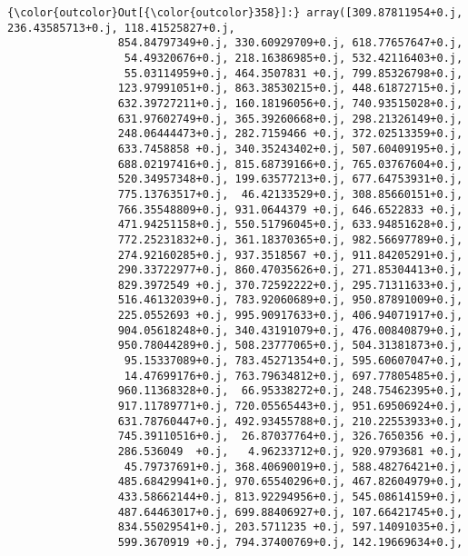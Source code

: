 \documentclass[11pt]{article}
\begin{document}
\begin{Verbatim}[commandchars=\\\{\}]
{\color{outcolor}Out[{\color{outcolor}358}]:} array([309.87811954+0.j, 236.43585713+0.j, 118.41525827+0.j,
                 854.84797349+0.j, 330.60929709+0.j, 618.77657647+0.j,
                  54.49320676+0.j, 218.16386985+0.j, 532.42116403+0.j,
                  55.03114959+0.j, 464.3507831 +0.j, 799.85326798+0.j,
                 123.97991051+0.j, 863.38530215+0.j, 448.61872715+0.j,
                 632.39727211+0.j, 160.18196056+0.j, 740.93515028+0.j,
                 631.97602749+0.j, 365.39260668+0.j, 298.21326149+0.j,
                 248.06444473+0.j, 282.7159466 +0.j, 372.02513359+0.j,
                 633.7458858 +0.j, 340.35243402+0.j, 507.60409195+0.j,
                 688.02197416+0.j, 815.68739166+0.j, 765.03767604+0.j,
                 520.34957348+0.j, 199.63577213+0.j, 677.64753931+0.j,
                 775.13763517+0.j,  46.42133529+0.j, 308.85660151+0.j,
                 766.35548809+0.j, 931.0644379 +0.j, 646.6522833 +0.j,
                 471.94251158+0.j, 550.51796045+0.j, 633.94851628+0.j,
                 772.25231832+0.j, 361.18370365+0.j, 982.56697789+0.j,
                 274.92160285+0.j, 937.3518567 +0.j, 911.84205291+0.j,
                 290.33722977+0.j, 860.47035626+0.j, 271.85304413+0.j,
                 829.3972549 +0.j, 370.72592222+0.j, 295.71311633+0.j,
                 516.46132039+0.j, 783.92060689+0.j, 950.87891009+0.j,
                 225.0552693 +0.j, 995.90917633+0.j, 406.94071917+0.j,
                 904.05618248+0.j, 340.43191079+0.j, 476.00840879+0.j,
                 950.78044289+0.j, 508.23777065+0.j, 504.31381873+0.j,
                  95.15337089+0.j, 783.45271354+0.j, 595.60607047+0.j,
                  14.47699176+0.j, 763.79634812+0.j, 697.77805485+0.j,
                 960.11368328+0.j,  66.95338272+0.j, 248.75462395+0.j,
                 917.11789771+0.j, 720.05565443+0.j, 951.69506924+0.j,
                 631.78760447+0.j, 492.93455788+0.j, 210.22553933+0.j,
                 745.39110516+0.j,  26.87037764+0.j, 326.7650356 +0.j,
                 286.536049  +0.j,   4.96233712+0.j, 920.9793681 +0.j,
                  45.79737691+0.j, 368.40690019+0.j, 588.48276421+0.j,
                 485.68429941+0.j, 970.65540296+0.j, 467.82604979+0.j,
                 433.58662144+0.j, 813.92294956+0.j, 545.08614159+0.j,
                 487.64463017+0.j, 699.88406927+0.j, 107.66421745+0.j,
                 834.55029541+0.j, 203.5711235 +0.j, 597.14091035+0.j,
                 599.3670919 +0.j, 794.37400769+0.j, 142.19669634+0.j,

\end{Verbatim}
\end{document}
